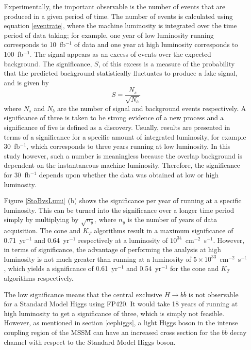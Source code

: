Experimentally, the important observable is the number of events that are produced in a given period of time. The number of events is calculated using equation \ref{eventrate}, where the machine luminosity is integrated over the time period of data taking; for example, one year of low luminosity running corresponds to 10~fb$^{-1}$ of data and one year at high luminosity corresponds to 100~fb$^{-1}$. %
The signal appears as an excess of events over the expected background. The 
significance, $S$, of this excess is a measure of the probability that the predicted background statistically fluctuates to produce a fake signal, and is given by
\begin{equation}
S = \frac{N_s}{\sqrt{N_b}}
\end{equation}
where $N_s$ and $N_b$ are the number of signal and background events respectively. A significance of three is taken to be strong evidence of a new process and a significance of five is defined as a discovery. Usually, results are presented in terms of a significance for a specific amount of integrated luminosity, for example 30~fb$^{-1}$, which corresponds to three years running at low luminosity. In this study however, such a number is meaningless because the overlap background is dependent on the instantaneous machine luminosity. Therefore, the significance for 30~fb$^{-1}$ depends upon whether the data was obtained at low or high luminosity.

Figure \ref{StoBvsLumi} (b) shows the significance per year of running at a specific luminosity. This can be turned into the significance over a longer time period simply by multiplying by $\sqrt{n_y}$, where $n_y$ is the number of years of data acquisition. The cone and $K_T$ algorithms result in a maximum significance of 0.71~yr$^{-1}$ and 0.64~yr$^{-1}$ respectively at a luminosity of $10^{34}$~cm$^{-2}$~s$^{-1}$. However, in terms of significance, the advantage of performing the analysis at high luminosity is not much greater than running at a luminosity of $5\times10^{33}$~cm$^{-2}$~s$^{-1}$, which yields a significance of 0.61~yr$^{-1}$ and 0.54~yr$^{-1}$ for the cone and $K_T$ algorithms respectively. 

The low significance means that the central exclusive  $H \rightarrow b \bar{b}$ is not observable for a Standard Model Higgs using FP420. It would take 18 years of running at high luminosity to get a significance of three, which is simply not feasible. However, as mentioned in section \ref{cephiggs}, a light Higgs boson in the intense coupling region of the MSSM can have an increased cross section for the $b\bar{b}$ decay channel with respect to the Standard Model Higgs boson.

